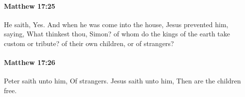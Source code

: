 		\paragraph{Matthew 17:25} %
			\label{MATTHEW-17-25}

			He saith, Yes. And when he was come into the house, Jesus prevented him, saying, What thinkest thou, Simon? of whom do the kings of the earth take custom or tribute? of their own children, or of strangers?

			\begin{framed}
			\scriptsize
				\begin{compactdesc}
					\item[SBLG] 
				\end{compactdesc}
			\end{framed}

		\paragraph{Matthew 17:26} %
			\label{MATTHEW-17-26}

			Peter saith unto him, Of strangers. Jesus saith unto him, Then are the children free.

